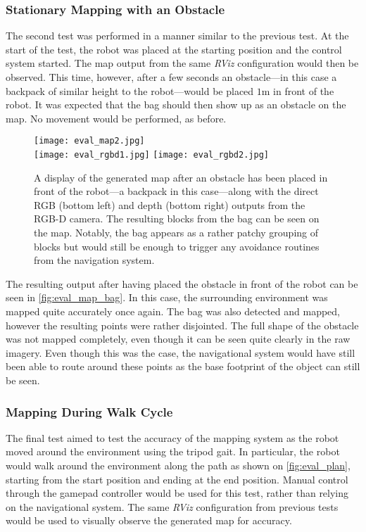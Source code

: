 \subsubsection{Stationary Mapping with an Obstacle}

The second test was performed in a manner similar to the previous test. At the start of the test, the robot was placed at the starting position and the control system started. The map output from the same \emph{RViz} configuration would then be observed. This time, however, after a few seconds an obstacle---in this case a backpack of similar height to the robot---would be placed $1$m in front of the robot. It was expected that the bag should then show up as an obstacle on the map. No movement would be performed, as before.

\begin{figure}[h]
	\centering
	\texttt{[image: eval\_map2.jpg]} \\
	\vspace{2pt}
	\texttt{[image: eval\_rgbd1.jpg]}
	\texttt{[image: eval\_rgbd2.jpg]}
	\caption{A display of the generated map after an obstacle has been placed in front of the robot---a backpack in this case---along with the direct RGB (bottom left) and depth (bottom right) outputs from the RGB-D camera. The resulting blocks from the bag can be seen on the map. Notably, the bag appears as a rather patchy grouping of blocks but would still be enough to trigger any avoidance routines from the navigation system.}
	\label{fig:eval_map_bag}
\end{figure}

The resulting output after having placed the obstacle in front of the robot can be seen in \autoref{fig:eval_map_bag}. In this case, the surrounding environment was mapped quite accurately once again. The bag was also detected and mapped, however the resulting points were rather disjointed. The full shape of the obstacle was not mapped completely, even though it can be seen quite clearly in the raw imagery. Even though this was the case, the navigational system would have still been able to route around these points as the base footprint of the object can still be seen.

\subsubsection{Mapping During Walk Cycle}

The final test aimed to test the accuracy of the mapping system as the robot moved around the environment using the tripod gait. In particular, the robot would walk around the environment along the path as shown on \autoref{fig:eval_plan}, starting from the start position and ending at the end position. Manual control through the gamepad controller would be used for this test, rather than relying on the navigational system. The same \emph{RViz} configuration from previous tests would be used to visually observe the generated map for accuracy.

